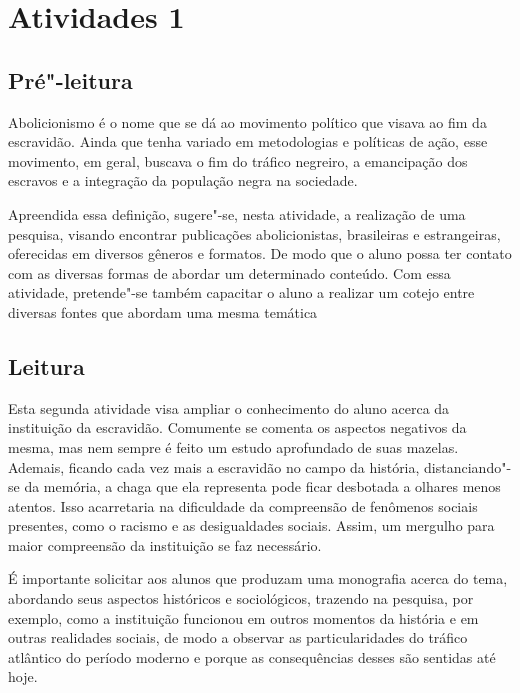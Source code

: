 \documentclass[12pt]{extarticle}
\begin{document}
\tableofcontents


\section{Atividades 1}


\subsection{Pré"-leitura}


Abolicionismo é o nome que se dá ao movimento político que
visava ao fim da escravidão. Ainda que tenha variado em metodologias e
políticas de ação, esse movimento, em geral, buscava o fim do tráfico
negreiro, a emancipação dos escravos e a integração da população negra
na sociedade.

Apreendida essa definição, sugere"-se, nesta atividade, a realização de
uma pesquisa, visando encontrar publicações abolicionistas, brasileiras
e estrangeiras, oferecidas em diversos gêneros e formatos. De modo que o
aluno possa ter contato com as diversas formas de abordar um determinado
conteúdo. Com essa atividade, pretende"-se também capacitar o aluno a
realizar um cotejo entre diversas fontes que abordam uma mesma temática

\subsection{Leitura}


Esta segunda atividade visa ampliar o conhecimento do aluno
acerca da instituição da escravidão. Comumente se comenta os aspectos
negativos da mesma, mas nem sempre é feito um estudo aprofundado de suas
mazelas. Ademais, ficando cada vez mais a escravidão no campo da
história, distanciando"-se da memória, a chaga que ela representa pode
ficar desbotada a olhares menos atentos. Isso acarretaria na dificuldade
da compreensão de fenômenos sociais presentes, como o racismo e as
desigualdades sociais. Assim, um mergulho para maior compreensão da
instituição se faz necessário.

É importante solicitar aos alunos que produzam uma monografia acerca do
tema, abordando seus aspectos históricos e sociológicos, trazendo na
pesquisa, por exemplo, como a instituição funcionou em outros momentos
da história e em outras realidades sociais, de modo a observar as
particularidades do tráfico atlântico do período moderno e porque as
consequências desses são sentidas até hoje.
\end{document}
